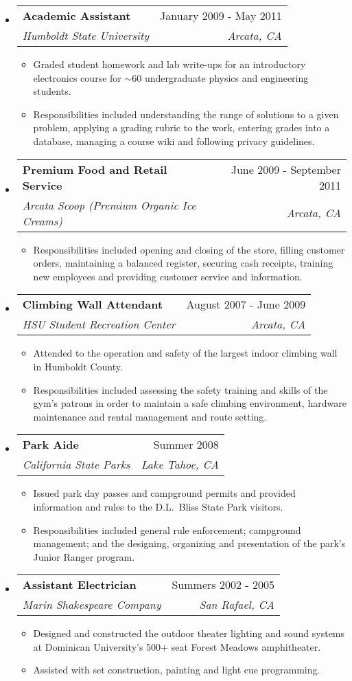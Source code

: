 \documentclass[letterpaper,11pt]{article}
\makeatletter
\newcommand{\resitem}[1]{\item #1 \vspace{-2pt}}
\newcommand{\ressubheading}[4]{
\begin{tabular*}{7.0in}{l@{\extracolsep{\fill}}r}
		\textbf{#1} & #2 \\
		\textit{#3} & \textit{#4} \\
\end{tabular*}\vspace{-6pt}}
\makeatother
\begin{document}
\begin{itemize}
\item
	\ressubheading{Academic Assistant}{January 2009 - May 2011}{Humboldt State University}{Arcata, CA}
	\begin{itemize}
		\resitem{Graded student homework and lab write-ups for an introductory electronics course for $\sim$60 undergraduate physics and engineering students.}
		\resitem{Responsibilities included understanding the range of solutions to a given problem, applying a grading rubric to the work, entering grades into a database, managing a course wiki and following privacy guidelines.}
	\end{itemize}
\item
	\ressubheading{Premium Food and Retail Service}{June 2009 - September  2011}{Arcata Scoop (Premium Organic Ice Creams)}{Arcata, CA}
	\begin{itemize}
		\resitem{Responsibilities included opening and closing of the store, filling customer orders, maintaining a balanced register, securing cash receipts, training new employees and providing customer service and information.}
	\end{itemize}
\pagebreak[0]
\item
	\ressubheading{Climbing Wall Attendant}{August 2007 - June 2009}{HSU Student Recreation Center}{Arcata, CA}
	\begin{itemize}
		\resitem{Attended to the operation and safety of the largest indoor climbing wall in Humboldt County.}
		\resitem{Responsibilities included assessing the safety training and skills of the gym's patrons in order to maintain a safe climbing environment, hardware maintenance and rental management and route setting.}
	\end{itemize}
\item
	\ressubheading{Park Aide}{Summer 2008}{California State Parks}{Lake Tahoe, CA}
	\begin{itemize}
		\resitem{Issued park day passes and campground permits and provided information and rules to the D.L.\ Bliss State Park visitors.}
		\resitem{Responsibilities included general rule enforcement; campground management; and the designing, organizing and presentation of the park's Junior Ranger program.}
	\end{itemize}
 \item
 	\ressubheading{Assistant Electrician}{Summers 2002 - 2005}{Marin Shakespeare Company}{San Rafael, CA}
 	\begin{itemize}
 		\resitem{Designed and constructed the outdoor theater lighting and sound systems at Dominican University's 500+ seat Forest Meadows amphitheater.}
 		\resitem{Assisted with set construction, painting and light cue programming.}
 	\end{itemize}
\end{itemize}
\end{document}
